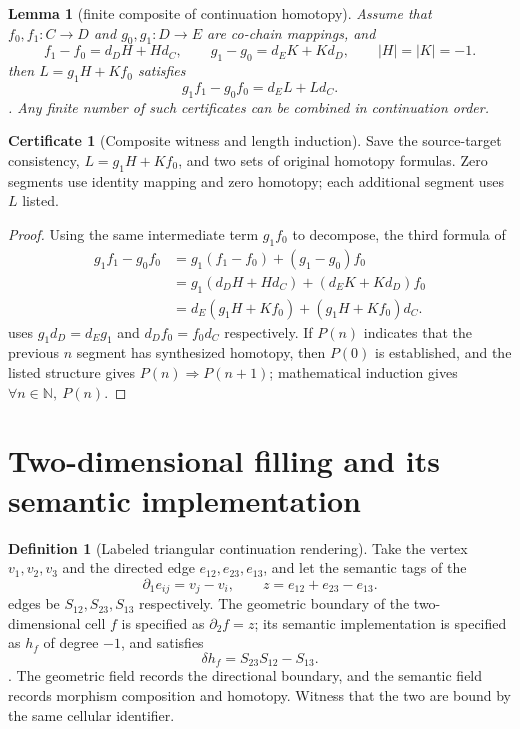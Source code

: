 \documentclass[12pt,a4paper,openany,notitlepage]{report}
\theoremstyle{plain}
\newtheorem{lemma}[theorem]{Lemma}
\theoremstyle{definition}
\newtheorem{definition}[theorem]{Definition}
\newtheorem*{certificate}{Certificate}
\theoremstyle{remark}
\begin{document}
\begin{CJK*}
\begin{lemma}
[finite composite of continuation homotopy]\label{hgov:lem-compose-homotopy}
Assume that $f_0,f_1:C\to D$ and $g_0,g_1:D\to E$ are co-chain mappings, and \[
 f_1-f_0=d_DH+Hd_C,\qquad
 g_1-g_0=d_EK+Kd_D,
 \qquad |H|=|K|=-1.
\] then $L=g_1H+Kf_0$ satisfies \[
 g_1f_1-g_0f_0=d_EL+Ld_C.
\]. Any finite number of such certificates can be combined in continuation order.\end{lemma}
\begin{certificate}
[Composite witness and length induction]Save the source-target consistency, $L=g_1H+Kf_0$, and two sets of original homotopy formulas. Zero segments use identity mapping and zero homotopy; each additional segment uses $L$ listed.\end{certificate}
\begin{proof}
Using the same intermediate term $g_1f_0$ to decompose, the third formula of \[
 \begin{aligned}
 g_1f_1-g_0f_0
 &=g_1(f_1-f_0)+(g_1-g_0)f_0\\
 &=g_1(d_DH+Hd_C)+(d_EK+Kd_D)f_0\\
 &=d_E(g_1H+Kf_0)+(g_1H+Kf_0)d_C.
 \end{aligned}
\] uses $g_1d_D=d_Eg_1$ and $d_Df_0=f_0d_C$ respectively. If $P(n)$ indicates that the previous $n$ segment has synthesized homotopy, then $P(0)$ is established, and the listed structure gives $P(n)\Rightarrow P(n+1)$; mathematical induction gives $\forall n\in\mathbb N,\ P(n)$.\end{proof}


\section { Two-dimensional filling and its semantic implementation }\label{hgov:two-cell}


\begin{definition}
[Labeled triangular continuation rendering]\label{hgov:def-triangle}
Take the vertex $v_1,v_2,v_3$ and the directed edge $e_{12},e_{23},e_{13}$, and let the semantic tags of the \[
 \partial_1e_{ij}=v_j-v_i,\qquad
 z=e_{12}+e_{23}-e_{13}.
\] edges be $S_{12},S_{23},S_{13}$ respectively. The geometric boundary of the two-dimensional cell $f$ is specified as $\partial_2f=z$; its semantic implementation is specified as $h_f$ of degree $-1$, and satisfies \[
 \delta h_f=S_{23}S_{12}-S_{13}.
\]. The geometric field records the directional boundary, and the semantic field records morphism composition and homotopy. Witness that the two are bound by the same cellular identifier.\end{definition}



\end{CJK*}
\end{document}
